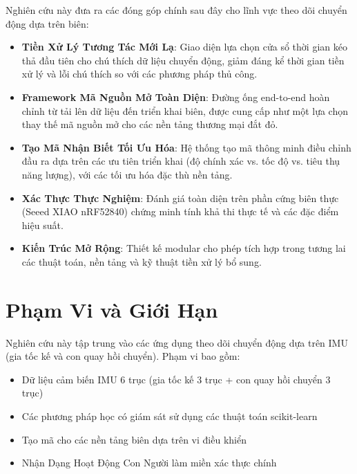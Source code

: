 Nghiên cứu này đưa ra các đóng góp chính sau đây cho lĩnh vực theo dõi chuyển động dựa trên biên:

\begin{itemize}
\item \textbf{Tiền Xử Lý Tương Tác Mới Lạ}: Giao diện lựa chọn cửa sổ thời gian kéo thả đầu tiên cho chú thích dữ liệu chuyển động, giảm đáng kể thời gian tiền xử lý và lỗi chú thích so với các phương pháp thủ công.

\item \textbf{Framework Mã Nguồn Mở Toàn Diện}: Đường ống end-to-end hoàn chỉnh từ tải lên dữ liệu đến triển khai biên, được cung cấp như một lựa chọn thay thế mã nguồn mở cho các nền tảng thương mại đắt đỏ.

\item \textbf{Tạo Mã Nhận Biết Tối Ưu Hóa}: Hệ thống tạo mã thông minh điều chỉnh đầu ra dựa trên các ưu tiên triển khai (độ chính xác vs. tốc độ vs. tiêu thụ năng lượng), với các tối ưu hóa đặc thù nền tảng.

\item \textbf{Xác Thực Thực Nghiệm}: Đánh giá toàn diện trên phần cứng biên thực (Seeed XIAO nRF52840) chứng minh tính khả thi thực tế và các đặc điểm hiệu suất.

\item \textbf{Kiến Trúc Mở Rộng}: Thiết kế modular cho phép tích hợp trong tương lai các thuật toán, nền tảng và kỹ thuật tiền xử lý bổ sung.

\end{itemize}

\section{Phạm Vi và Giới Hạn}

Nghiên cứu này tập trung vào các ứng dụng theo dõi chuyển động dựa trên IMU (gia tốc kế và con quay hồi chuyển). Phạm vi bao gồm:

\begin{itemize}
\item Dữ liệu cảm biến IMU 6 trục (gia tốc kế 3 trục + con quay hồi chuyển 3 trục)
\item Các phương pháp học có giám sát sử dụng các thuật toán scikit-learn
\item Tạo mã cho các nền tảng biên dựa trên vi điều khiển
\item Nhận Dạng Hoạt Động Con Người làm miền xác thực chính
\end{itemize}

